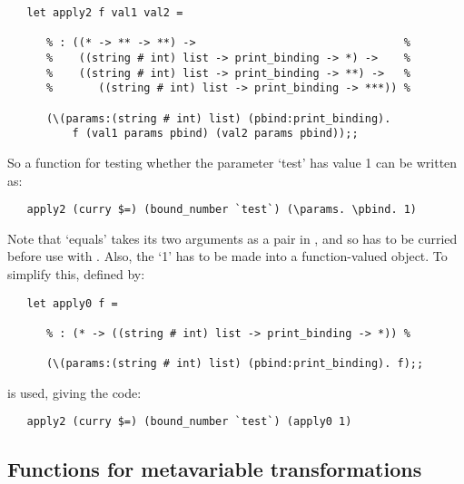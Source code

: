 \begin{boxed}\begin{verbatim}
   let apply2 f val1 val2 =

      % : ((* -> ** -> **) ->                                %
      %    ((string # int) list -> print_binding -> *) ->    %
      %    ((string # int) list -> print_binding -> **) ->   %
      %       ((string # int) list -> print_binding -> ***)) %

      (\(params:(string # int) list) (pbind:print_binding).
          f (val1 params pbind) (val2 params pbind));;
\end{verbatim}\end{boxed}

\noindent
So a function for testing whether the parameter `test' has value 1 can be
written as:

\begin{small}\begin{verbatim}
   apply2 (curry $=) (bound_number `test`) (\params. \pbind. 1)
\end{verbatim}\end{small}

\noindent
Note that `equals' takes its two arguments as a pair in \ML, and so has to be
curried before use with . Also, the `1' has to be made into a 
function-valued object. To simplify this,  defined by:

\begin{boxed}\begin{verbatim}
   let apply0 f =

      % : (* -> ((string # int) list -> print_binding -> *)) %

      (\(params:(string # int) list) (pbind:print_binding). f);;
\end{verbatim}\end{boxed}

\noindent
is used, giving the code:

\begin{small}\begin{verbatim}
   apply2 (curry $=) (bound_number `test`) (apply0 1)
\end{verbatim}\end{small}


\subsection{Functions for metavariable transformations}

